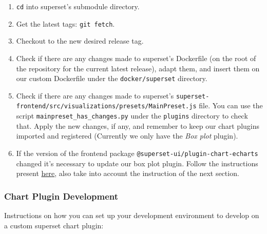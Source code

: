 \documentclass[
]{book}
\begin{document}
\begin{enumerate}
\def\labelenumi{\arabic{enumi}.}
\item
  \texttt{cd} into superset's submodule directory.
\item
  Get the latest tags: \texttt{git\ fetch}.
\item
  Checkout to the new desired release tag.
\item
  Check if there are any changes made to superset's Dockerfile (on the root of the repository for the current latest release), adapt them, and insert them on our custom Dockerfile under the \texttt{docker/superset} directory.
\item
  Check if there are any changes made to superset's \texttt{superset-frontend/src/visualizations/presets/MainPreset.js} file.
  You can use the script \texttt{mainpreset\_has\_changes.py} under the \texttt{plugins} directory to check that.
  Apply the new changes, if any, and remember to keep our chart plugins imported and registered (Currently we only have the \emph{Box plot} plugin).
\item
  If the version of the frontend package \texttt{@superset-ui/plugin-chart-echarts} changed it's necessary to update our box plot plugin.
  Follow the instructions present \href{https://github.com/EHDEN/NetworkDashboards/tree/master/superset/plugins/plugins/plugin-chart-box-plot\#how-to-update}{here}, also take into account the instruction of the next section.
\end{enumerate}

\hypertarget{chart-plugin-development}{%
\subsubsection*{Chart Plugin Development}\label{chart-plugin-development}}

Instructions on how you can set up your development environment to develop on a custom superset chart plugin:
\end{document}
